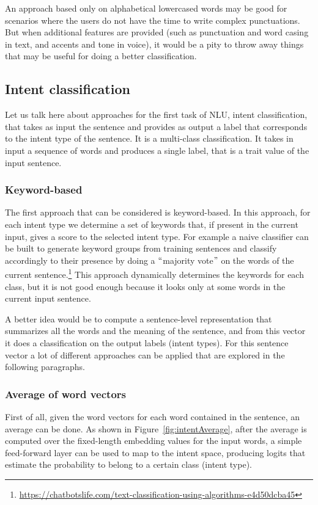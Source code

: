 An approach based only on alphabetical lowercased words may be good for scenarios where the users do not have the time to write complex punctuations. But when additional features are provided (such as punctuation and word casing in text, and accents and tone in voice), it would be a pity to throw away things that may be useful for doing a better classification.

\subsection{Intent classification}
\label{soaIntent}

Let us talk here about approaches for the first task of NLU, intent classification, that takes as input the sentence and provides as output a label that corresponds to the intent type of the sentence. It is a multi-class classification. It takes in input a sequence of words and produces a single label, that is a trait value of the input sentence.

\subsubsection{Keyword-based}
The first approach that can be considered is keyword-based. In this approach, for each intent type we determine a set of keywords that, if present in the current input, gives a score to the selected intent type. For example a naive classifier can be built to generate keyword groups from training sentences and classify accordingly to their presence by doing a $``$majority vote$"$  on the words of the current sentence.\footnote{\url{https://chatbotslife.com/text-classification-using-algorithms-e4d50dcba45}} This approach dynamically determines the keywords for each class, but it is not good enough because it looks only at some words in the current input sentence.

A better idea would be to compute a sentence-level representation that summarizes all the words and the meaning of the sentence, and from this vector it does a classification on the output labels (intent types). For this sentence vector a lot of different approaches can be applied that are explored in the following paragraphs.

\subsubsection{Average of word vectors}
First of all, given the word vectors for each word contained in the sentence, an average can be done. As shown in Figure~\ref{fig:intentAverage}, after the average is computed over the fixed-length embedding values for the input words, a simple feed-forward layer can be used to map to the intent space, producing logits that estimate the probability to belong to a certain class (intent type).

